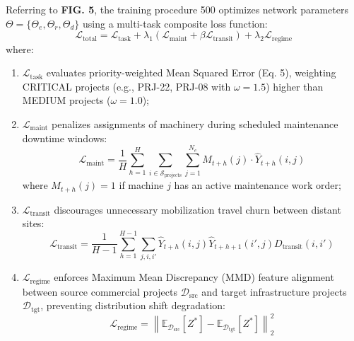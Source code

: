 \documentclass[11pt,a4paper]{article}
\begin{document}
\noindent Referring to \textbf{FIG. 5}, the training procedure 500 optimizes network parameters $\Theta = \{\Theta_e, \Theta_r, \Theta_d\}$ using a multi-task composite loss function:
\begin{equation}
\mathcal{L}_{\text{total}} = \mathcal{L}_{\text{task}} + \lambda_1 \left(\mathcal{L}_{\text{maint}} + \beta \mathcal{L}_{\text{transit}}\right) + \lambda_2 \mathcal{L}_{\text{regime}} \label{eq:loss_spec}
\end{equation}
where:
\begin{enumerate}
    \item $\mathcal{L}_{\text{task}}$ evaluates priority-weighted Mean Squared Error (Eq. 5), weighting CRITICAL projects (e.g., PRJ-22, PRJ-08 with $\omega = 1.5$) higher than MEDIUM projects ($\omega = 1.0$);
    \item $\mathcal{L}_{\text{maint}}$ penalizes assignments of machinery during scheduled maintenance downtime windows:
    \begin{equation}
    \mathcal{L}_{\text{maint}} = \frac{1}{H} \sum_{h=1}^H \sum_{i \in \mathcal{S}_{\text{projects}}} \sum_{j=1}^{N_e} M_{t+h}(j) \cdot \widehat{Y}_{t+h}(i, j) \label{eq:maint_spec}
    \end{equation}
    where $M_{t+h}(j) = 1$ if machine $j$ has an active maintenance work order;
    \item $\mathcal{L}_{\text{transit}}$ discourages unnecessary mobilization travel churn between distant sites:
    \begin{equation}
    \mathcal{L}_{\text{transit}} = \frac{1}{H-1} \sum_{h=1}^{H-1} \sum_{j, i, i'} \widehat{Y}_{t+h}(i, j) \widehat{Y}_{t+h+1}(i', j) D_{\text{transit}}(i, i') \label{eq:transit_spec}
    \end{equation}
    \item $\mathcal{L}_{\text{regime}}$ enforces Maximum Mean Discrepancy (MMD) feature alignment between source commercial projects $\mathcal{D}_{\text{src}}$ and target infrastructure projects $\mathcal{D}_{\text{tgt}}$, preventing distribution shift degradation:
    \begin{equation}
    \mathcal{L}_{\text{regime}} = \left\| \mathbb{E}_{\mathcal{D}_{\text{src}}}[Z^*] - \mathbb{E}_{\mathcal{D}_{\text{tgt}}}[Z^*] \right\|_2^2 \label{eq:regime_spec}
    \end{equation}
\end{enumerate}
\end{document}
